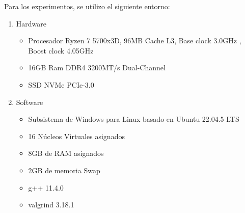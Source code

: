 
Para los experimentos, se utilizo el siguiente entorno:

\begin{enumerate}

    \item Hardware
        \begin{itemize}
            \item Procesador Ryzen 7 5700x3D, 96MB Cache L3, Base clock 3.0GHz , Boost clock 4.05GHz
            \item 16GB Ram DDR4 3200MT/s Dual-Channel
            \item SSD NVMe PCIe-3.0
        \end{itemize}
    \item Software
        \begin{itemize}
            \item Subsistema de Windows para Linux basado en Ubuntu 22.04.5 LTS
            \item 16 Núcleos Virtuales asignados
            \item 8GB de RAM asignados
            \item 2GB de memoria Swap
            \item g++ 11.4.0
            \item valgrind 3.18.1
        \end{itemize}
\end{enumerate}